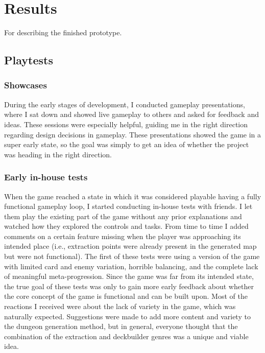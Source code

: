 \chapter{Results} \label{Chapter:Results}

For describing the finished prototype.

\section{Playtests}

\subsection{Showcases}

During the early stages of development, I conducted gameplay presentations, where I sat down and showed live gameplay to others and asked for feedback and ideas. These sessions were especially helpful, guiding me in the right direction regarding design decisions in gameplay. These presentations showed the game in a super early state, so the goal was simply to get an idea of whether the project was heading in the right direction.

\subsection{Early in-house tests}

When the game reached a state in which it was considered playable having a fully functional gameplay loop, I started conducting in-house tests with friends. I let them play the existing part of the game without any prior explanations and watched how they explored the controls and tasks. From time to time I added comments on a certain feature missing when the player was approaching its intended place (i.e., extraction points were already present in the generated map but were not functional). The first of these tests were using a version of the game with limited card and enemy variation, horrible balancing, and the complete lack of meaningful meta-progression. Since the game was far from its intended state, the true goal of these tests was only to gain more early feedback about whether the core concept of the game is functional and can be built upon. Most of the reactions I received were about the lack of variety in the game, which was naturally expected. Suggestions were made to add more content and variety to the dungeon generation method, but in general, everyone thought that the combination of the extraction and deckbuilder genres was a unique and viable idea.

